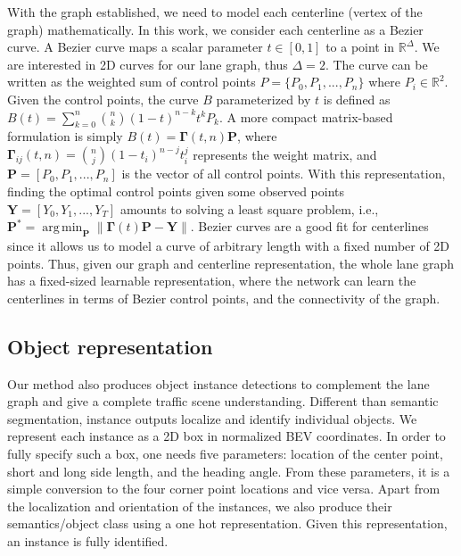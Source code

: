\documentclass[10pt,twocolumn,letterpaper]{article}
\DeclareMathOperator*{\argmin}{arg\,min}
\begin{document}
With the graph established, we need to model each centerline (vertex of the graph) mathematically. In this work, we consider each centerline as a Bezier curve. A Bezier curve maps a scalar parameter $t \in [0,1]$ to a point in $\!\mathbb{R}^\Delta$. We are interested in 2D curves for our lane graph, thus $\Delta = 2$. The curve can be written as the weighted sum of control points $\!P = \{P_0, P_1, ..., P_n\}$ where $P_i \in \!\mathbb{R}^2$. Given the control points, the curve $B$ parameterized by $t$ is defined as $B(t) = \sum_{k=0}^n \binom{n}{k} (1-t)^{n-k}t^k P_k$. A more compact matrix-based formulation is simply $B(t) = \boldsymbol{\Gamma}(t,n)\boldsymbol{P}$, where $\boldsymbol{\Gamma}_{ij}(t,n) =\binom{n}{j} (1-t_i)^{n-j}t_i^j$ represents the weight matrix, and $\boldsymbol{P}=[P_0, P_1,...,P_n]$ is the vector of all control points. With this representation, finding the optimal control points given some observed points $\boldsymbol{Y}=[Y_0, Y_1,...,Y_T]$ amounts to solving a least square problem, i.e., $\boldsymbol{P^*}= \argmin_{\boldsymbol{P}} \|\boldsymbol{\Gamma}(t)\boldsymbol{P} - \boldsymbol{Y}\|$. 
Bezier curves are a good fit for centerlines since it allows us to model a curve of arbitrary length with a fixed number of 2D points.
Thus, given our graph and centerline representation, the whole lane graph has a fixed-sized learnable representation, where the network can learn the centerlines in terms of Bezier control points, and the connectivity of the graph.

\subsection{Object representation}
Our method also produces object instance detections to complement the lane graph and give a complete traffic scene understanding. Different than semantic segmentation, instance outputs localize and identify individual objects. We represent each instance as a 2D box in normalized BEV coordinates. In order to fully specify such a box, one needs five parameters: location of the center point, short and long side length, and the heading angle. 
From these parameters, it is a simple conversion to the four corner point locations and vice versa. Apart from the localization and orientation of the instances, we also produce their semantics/object class using a one hot representation. Given this representation, an instance is fully identified. 
\end{document}
